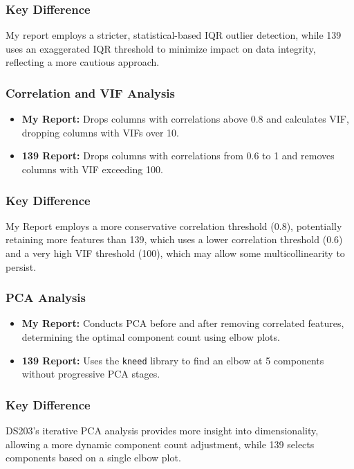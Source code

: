 \subsubsection*{Key Difference}
My report employs a stricter, statistical-based IQR outlier detection, while 139 uses an exaggerated IQR threshold to minimize impact on data integrity, reflecting a more cautious approach.

\subsubsection*{Correlation and VIF Analysis}
\begin{itemize}
    \item \textbf{My Report:} Drops columns with correlations above 0.8 and calculates VIF, dropping columns with VIFs over 10.
    \item \textbf{139 Report:} Drops columns with correlations from 0.6 to 1 and removes columns with VIF exceeding 100.
\end{itemize}

\subsubsection*{Key Difference}
My Report employs a more conservative correlation threshold (0.8), potentially retaining more features than 139, which uses a lower correlation threshold (0.6) and a very high VIF threshold (100), which may allow some multicollinearity to persist.

\subsubsection*{PCA Analysis}
\begin{itemize}
    \item \textbf{My Report:} Conducts PCA before and after removing correlated features, determining the optimal component count using elbow plots.
    \item \textbf{139 Report:} Uses the \texttt{kneed} library to find an elbow at 5 components without progressive PCA stages.
\end{itemize}

\subsubsection*{Key Difference}
DS203’s iterative PCA analysis provides more insight into dimensionality, allowing a more dynamic component count adjustment, while 139 selects components based on a single elbow plot.

